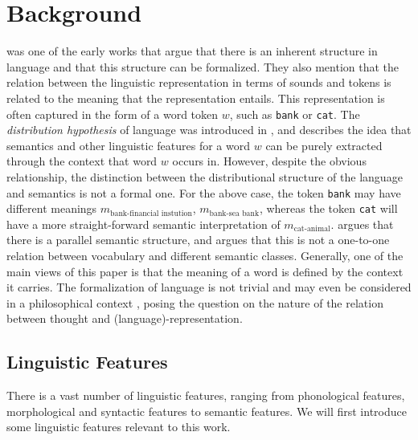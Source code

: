 \documentclass[a4paper,12pt,oneside,openright]{report}
\begin{document}
\chapter{Background}\label{section:Background} 

\cite{harris54} was one of the early works that argue that there is an inherent structure in language and that this structure can be formalized.
They also mention that the relation between the linguistic representation in terms of sounds and tokens is related to the meaning that the representation entails. 
This representation is often captured in the form of a word token $w$, such as \Verb#bank# or \Verb#cat#.
The \textit{distribution hypothesis} of language was introduced in \cite{harris54}, and describes the idea that semantics and other linguistic features for a word $w$ can be purely extracted through the context that word $w$ occurs in.
However, despite the obvious relationship, the distinction between the distributional structure of the language and semantics is not a formal one. 
For the above case, the token \Verb#bank# may have different meanings $m_\text{bank-financial instution}$, $m_\text{bank-sea bank}$, whereas the token \Verb#cat# will have a more straight-forward semantic interpretation of $m_\text{cat-animal}$.
\cite{harris54} argues that there is a parallel semantic structure, and argues that this is not a one-to-one relation between vocabulary and different semantic classes.
Generally, one of the main views of this paper is that the meaning of a word is defined by the context it carries.
The formalization of language is not trivial and may even be considered in a philosophical context \cite{hegel17, wittgenstein53}, posing the question on the nature of the relation between thought and (language)-representation.

\section{Linguistic Features}

There is a vast number of linguistic features, ranging from phonological features, morphological and syntactic features to semantic features.
We will first introduce some linguistic features relevant to this work.
\end{document}
